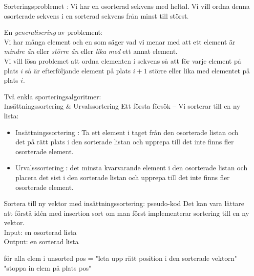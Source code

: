 \documentclass{lecturenotes}
\begin{document}
\begin{Slide}{Sorteringsproblemet}
: Vi har en osorterad sekvens med heltal. Vi vill ordna denna osorterade sekvens i en sorterad sekvens från minst till störst.
\pause

\vspace{2em}
En \emph{generalisering} av problement: \\ \vspace{1em} Vi har många element och en  som säger vad vi menar med att ett element är \emph{mindre än} eller \emph{större än} eller \emph{lika med} ett annat element. \\ \vspace{1em}
Vi vill lösa problemet att ordna elementen i sekvens så att för varje element på plats $i$ så är efterföljande element på plats $i + 1$ större eller lika med elementet på plats $i$.

\end{Slide} 

\begin{Slide}{Två enkla sporteringsalgoritmer: \\ Insättningssortering \& Urvalssortering}
Ett första försök -- Vi sorterar till en ny lista:
\begin{itemize}
\item Insättningssortering : Ta ett element i taget från den osorterade listan och  det på rätt plats i den sorterade listan och upprepa till det inte finns fler osorterade element. 
\pause
\item Urvalsssortering :  det minsta kvarvarande element i den osorterade listan och placera det sist i den sorterade listan och upprepa till det inte finns fler osorterade element. 
\end{itemize}
\end{Slide} 


\begin{Slide}{Sortera till ny vektor med insättningssortering: pseudo-kod}
Det kan vara lättare att förstå idén med insertion sort om man först implementerar sortering till en ny vektor. \\ \vspace{1em}
Input: en osorterad lista  \\
Output: en sorterad lista 
\begin{Code}
för alla elem i unsorted {
   pos = "leta upp rätt position i den sorterade vektorn"
   "stoppa in elem på plats pos" 
}
\end{Code}
\end{Slide}
\end{document}
